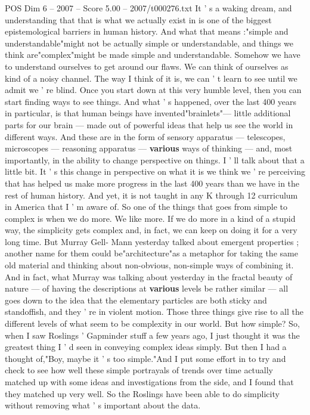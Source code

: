 \begin{textsample}{POS Dim 6 – 2007 – Score 5.00 – 2007/t000276.txt}
It ' s a waking dream, and understanding that that is what we actually exist in is one of the biggest epistemological barriers in human history.
And what that means :"simple and understandable"might not be actually simple or understandable, and things we think are"complex"might be made simple and understandable.
Somehow we have to understand ourselves to get around our flaws.
We can think of ourselves as kind of a noisy channel.
The way I think of it is, we can ' t learn to see until we admit we ' re blind.
Once you start down at this very humble level, then you can start finding ways to see things.
And what ' s happened, over the last 400 years in particular, is that human beings have invented"brainlets"— little additional parts for our brain — made out of powerful ideas that help us see the world in different ways.
And these are in the form of sensory apparatus — telescopes, microscopes — reasoning apparatus — \textbf{various} ways of thinking — and, most importantly, in the ability to change perspective on things.
I ' ll talk about that a little bit.
It ' s this change in perspective on what it is we think we ' re perceiving that has helped us make more progress in the last 400 years than we have in the rest of human history.
And yet, it is not taught in any K through 12 curriculum in America that I ' m aware of.
So one of the things that goes from simple to complex is when we do more.
We like more.
If we do more in a kind of a stupid way, the simplicity gets complex and, in fact, we can keep on doing it for a very long time.
But Murray Gell- Mann yesterday talked about emergent properties ; another name for them could be"architecture"as a metaphor for taking the same old material and thinking about non-obvious, non-simple ways of combining it.
And in fact, what Murray was talking about yesterday in the fractal beauty of nature — of having the descriptions at \textbf{various} levels be rather similar — all goes down to the idea that the elementary particles are both sticky and standoffish, and they ' re in violent motion.
Those three things give rise to all the different levels of what seem to be complexity in our world.
But how simple?
So, when I saw Roslings ' Gapminder stuff a few years ago, I just thought it was the greatest thing I ' d seen in conveying complex ideas simply.
But then I had a thought of,"Boy, maybe it ' s too simple."And I put some effort in to try and check to see how well these simple portrayals of trends over time actually matched up with some ideas and investigations from the side, and I found that they matched up very well.
So the Roslings have been able to do simplicity without removing what ' s important about the data.

\end{textsample}
